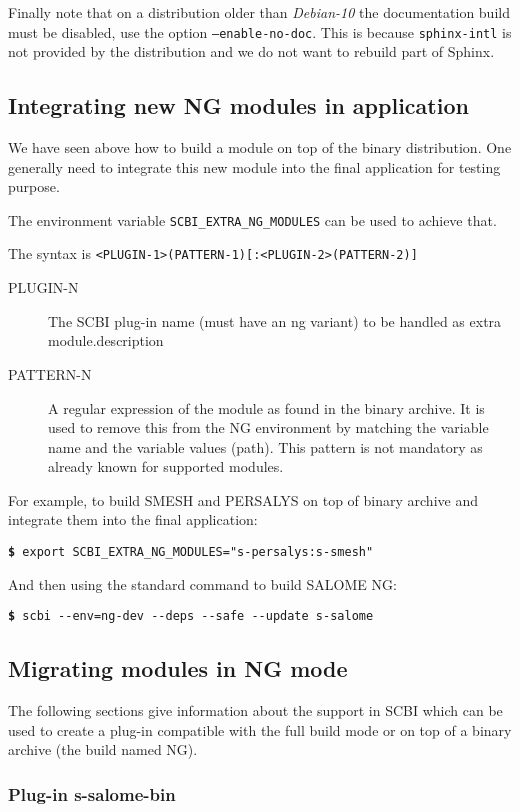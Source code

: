 \documentclass[a4paper,12pt,twoside]{article}
\newcommand{\code}[1]{\texttt{#1}}
\renewcommand{\emph}[1]{\textit{#1}}
\newcommand{\cmd}[1]{\tabto{1cm}\hspace{0.5cm}\texttt{\textbf{\$} #1}}
\newcommand{\ddash}{-{}-}
\begin{document}
Finally note that on a distribution older than \emph{Debian-10} the documentation build must be disabled, use the option \code{--enable-no-doc}. This is because \code{sphinx-intl} is not provided by the distribution and we do not want to rebuild part of Sphinx.

\subsection{Integrating new NG modules in application}

We have seen above how to build a module on top of the binary distribution. One generally need to integrate this new module into the final application for testing purpose.

The environment variable \code{SCBI\_EXTRA\_NG\_MODULES} can be used to achieve that.

The syntax is \code{<PLUGIN-1>(PATTERN-1)[:<PLUGIN-2>(PATTERN-2)]}

\begin{description}
	\item[PLUGIN-N] The SCBI plug-in name (must have an ng variant) to be handled as extra module.description
	\item[PATTERN-N] A regular expression of the module as found in the binary archive. It is used to remove this from the NG environment by matching the variable name and the variable values (path). This pattern is not mandatory as already known for supported modules.
\end{description}

For example, to build SMESH and PERSALYS on top of binary archive and integrate them into the final application:

\cmd{export SCBI\_EXTRA\_NG\_MODULES="s-persalys:s-smesh"}

And then using the standard command to build SALOME NG:

\cmd{scbi \ddash{}env=ng-dev \ddash{}deps \ddash{}safe \ddash{}update s-salome}

\subsection{Migrating modules in NG mode}
\label{migrateng}

The following sections give information about the support in SCBI which can be used to create a plug-in compatible with the full build mode or on top of a binary archive (the build named NG).

\subsubsection{Plug-in s-salome-bin}
\label{pg:salbin}
\end{document}
